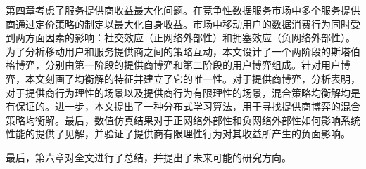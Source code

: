 第四章考虑了服务提供商收益最大化问题。在竞争性数据服务市场中多个服务提供商通过定价策略的制定以最大化自身收益。市场中移动用户的数据消费行为同时受到两方面因素的影响：社交效应（{\kaishu 正网络外部性}）和拥塞效应（{\kaishu 负网络外部性}）。为了分析移动用户和服务提供商之间的策略互动，本文设计了一个两阶段的斯塔伯格博弈，分别由第一阶段的提供商博弈和第二阶段的用户博弈组成。针对用户博弈，本文刻画了均衡解的特征并建立了它的唯一性。对于提供商博弈，分析表明，对于提供商行为理性的场景以及提供商行为有限理性的场景，混合策略均衡解均是有保证的。进一步，本文提出了一种分布式学习算法，用于寻找提供商博弈的混合策略均衡解。最后，数值仿真结果对于正网络外部性和负网络外部性如何影响系统性能的提供了见解，并验证了提供商有限理性行为对其收益所产生的负面影响。


最后，第六章对全文进行了总结，并提出了未来可能的研究方向。